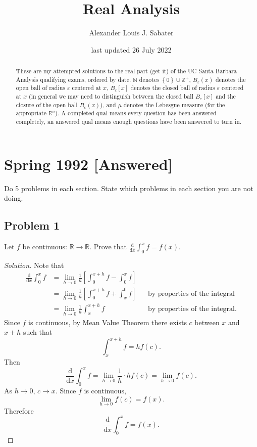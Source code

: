 \documentclass[12pt]{article}
\newcommand{\n}{\mathbb{N}}
\newcommand{\z}{\mathbb{Z}}
\newcommand{\real}{\mathbb{R}}
\newcommand\setb[1]{\left \{ #1 \right \}}
\newcommand{\sqbrack}[1]{\left [ #1 \right ]}
\newcommand{\eps}{\varepsilon}
\theoremstyle{definition}
\begin{document}
\date{last updated 26 July 2022} 
\author{Alexander Louis J. Sabater}
\title{Real Analysis}
\maketitle
\newpage 
\tableofcontents
\newpage
\begin{abstract}
    These are my attempted solutions to the real part (get it) of the UC Santa Barbara Analysis qualifying exams, ordered by date. $\n$ denotes $\setb{ 0 } \cup \z^+$, $B_{\eps}(x)$ denotes the open ball of radius $\eps$ centered at $x$, $B_{\eps}[x]$ denotes the closed ball of radius $\eps$ centered at $x$ (in general we may need to distinguish between the closed ball $B_{\eps}[x]$ and the closure of the open ball $B_{\eps}(x)$), and $\mu$ denotes the Lebesgue measure (for the appropriate $\real^n$). A completed qual means every question has been answered completely, an answered qual means enough questions have been answered to turn in.
\end{abstract}
\section{Spring 1992 [Answered]}
Do 5 problems in each section. State which problems in each section you are not doing.
\subsection{Problem 1 \texorpdfstring{\cite{PZ}}{}}
Let $f$ be continuous: $\real \to \real$. Prove that $\displaystyle \frac{\mathrm{d}}{\mathrm{d}x} \int_0^x f = f(x)$.
\begin{proof}[Solution]
    Note that 
    \begin{align*}
        \frac{\mathrm{d}}{\mathrm{d}x} \int_0^x f & = \lim\limits_{h \to 0} \frac{1}{h} \sqbrack{ \int_0^{x+h} f - \int_0^x f } \\
        & = \lim\limits_{h \to 0} \frac{1}{h} \sqbrack{ \int_0^{x+h} f + \int_x^0 f } && \text{by properties of the integral} \\
        & = \lim\limits_{h \to 0} \frac{1}{h} \int_x^{x+h} f && \text{by properties of the integral.}
    \end{align*}
    Since $f$ is continuous, by Mean Value Theorem there exists $c$ between $x$ and $x+h$ such that 
    \[
        \int_x^{x+h} f = h f(c).
    \]
    Then 
    \[
         \frac{\mathrm{d}}{\mathrm{d}x} \int_0^x f = \lim\limits_{h \to 0} \frac{1}{h} \cdot h f(c) = \lim\limits_{h \to 0} f(c).
    \]
    As $h \to 0$, $c \to x$. Since $f$ is continuous,
    \[
        \lim\limits_{h \to 0} f(c) = f(x).
    \]
    Therefore 
    \[
        \frac{\mathrm{d}}{\mathrm{d}x} \int_0^x f = f(x).
    \]
\end{proof}
\end{document}

